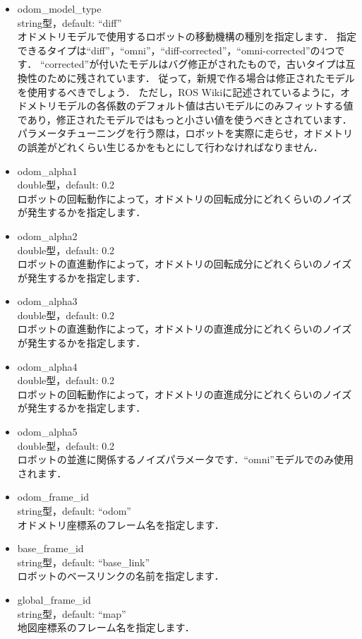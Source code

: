 \documentclass[{../../master}]{subfiles}
\begin{document}
\begin{itemize}
  \item \textsf{odom\_model\_type} \\
    string型，default: ``diff'' \\
    オドメトリモデルで使用するロボットの移動機構の種別を指定します．
    指定できるタイプは``diff''，``omni''，``diff-corrected''，``omni-corrected''の4つです．
    ``corrected''が付いたモデルはバグ修正がされたもので，古いタイプは互換性のために残されています．
    従って，新規で作る場合は修正されたモデルを使用するべきでしょう．
    ただし，ROS Wikiに記述されているように，オドメトリモデルの各係数のデフォルト値は古いモデルにのみフィットする値であり，修正されたモデルではもっと小さい値を使うべきとされています．
    パラメータチューニングを行う際は，ロボットを実際に走らせ，オドメトリの誤差がどれくらい生じるかをもとにして行わなければなりません．
  \item \textsf{odom\_alpha1} \\
    double型，default: 0.2 \\
    ロボットの回転動作によって，オドメトリの回転成分にどれくらいのノイズが発生するかを指定します．
  \item \textsf{odom\_alpha2} \\
    double型，default: 0.2 \\
    ロボットの直進動作によって，オドメトリの回転成分にどれくらいのノイズが発生するかを指定します．
  \item \textsf{odom\_alpha3} \\
    double型，default: 0.2 \\
    ロボットの直進動作によって，オドメトリの直進成分にどれくらいのノイズが発生するかを指定します．
  \item \textsf{odom\_alpha4} \\
    double型，default: 0.2 \\
    ロボットの回転動作によって，オドメトリの直進成分にどれくらいのノイズが発生するかを指定します．
  \item \textsf{odom\_alpha5} \\
    double型，default: 0.2 \\
    ロボットの並進に関係するノイズパラメータです．``omni''モデルでのみ使用されます．
  \item \textsf{odom\_frame\_id} \\
    string型，default: ``odom'' \\
    オドメトリ座標系のフレーム名を指定します．
  \item \textsf{base\_frame\_id} \\
    string型，default: ``base\_link'' \\
    ロボットのベースリンクの名前を指定します．
  \item \textsf{global\_frame\_id} \\
    string型，default: ``map'' \\
    地図座標系のフレーム名を指定します．
\end{itemize}
\end{document}

